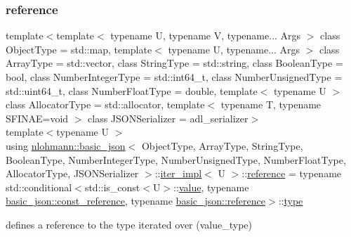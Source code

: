 \subsubsection{\texorpdfstring{reference}{reference}}
{\footnotesize\ttfamily template$<$template$<$ typename U, typename V, typename... Args $>$ class Object\+Type = std\+::map, template$<$ typename U, typename... Args $>$ class Array\+Type = std\+::vector, class String\+Type  = std\+::string, class Boolean\+Type  = bool, class Number\+Integer\+Type  = std\+::int64\+\_\+t, class Number\+Unsigned\+Type  = std\+::uint64\+\_\+t, class Number\+Float\+Type  = double, template$<$ typename U $>$ class Allocator\+Type = std\+::allocator, template$<$ typename T, typename S\+F\+I\+N\+A\+E=void $>$ class J\+S\+O\+N\+Serializer = adl\+\_\+serializer$>$ \\
template$<$typename U $>$ \\
using \hyperlink{classnlohmann_1_1basic__json}{nlohmann\+::basic\+\_\+json}$<$ Object\+Type, Array\+Type, String\+Type, Boolean\+Type, Number\+Integer\+Type, Number\+Unsigned\+Type, Number\+Float\+Type, Allocator\+Type, J\+S\+O\+N\+Serializer $>$\+::\hyperlink{classnlohmann_1_1basic__json_1_1iter__impl}{iter\+\_\+impl}$<$ U $>$\+::\hyperlink{classnlohmann_1_1basic__json_1_1iter__impl_ae09599e9cb4a947020a0265c0c4f3d5e}{reference} =  typename std\+::conditional$<$std\+::is\+\_\+const$<$U$>$\+::\hyperlink{classnlohmann_1_1basic__json_1_1iter__impl_a92e849ca687355935c02f492be936b68}{value}, typename \hyperlink{classnlohmann_1_1basic__json_a4057c5425f4faacfe39a8046871786ca}{basic\+\_\+json\+::const\+\_\+reference}, typename \hyperlink{classnlohmann_1_1basic__json_ac6a5eddd156c776ac75ff54cfe54a5bc}{basic\+\_\+json\+::reference}$>$\+::\hyperlink{classnlohmann_1_1basic__json_a2b2d781d7f2a4ee41bc0016e931cadf7}{type}}



defines a reference to the type iterated over (value\+\_\+type) 

\mbox{\label{classnlohmann_1_1basic__json_1_1iter__impl_a4d0518f3f2edae9dbaf7ef02f4f20add}} 
